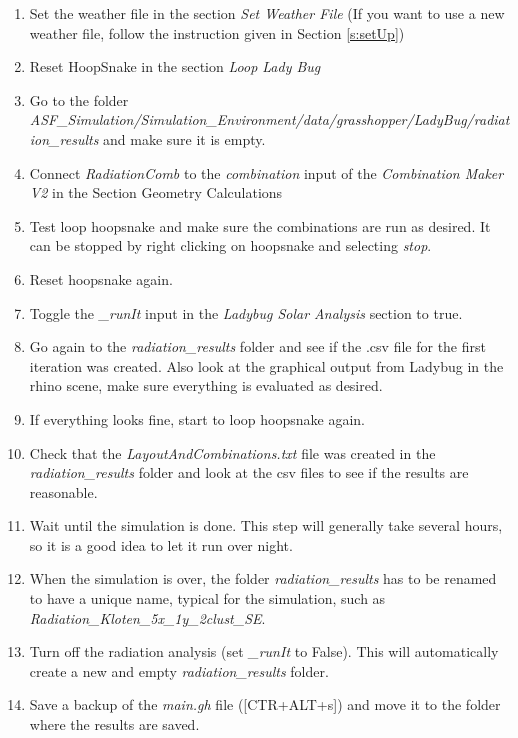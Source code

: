 	\begin{enumerate}

	\item Set the weather file in the section \emph{Set Weather File} (If you want to use a new weather file, follow the instruction given in Section \ref{s:setUp})

	\item Reset HoopSnake in the section \emph{Loop Lady Bug}

	\item Go to the folder \emph{ASF\_Simulation/Simulation\_Environment/data/}\linebreak\emph{grasshopper/LadyBug/radiation\_results} and make sure it is empty. 

	\item Connect \emph{RadiationComb} to the \emph{combination} input of the \emph{Combination Maker V2} in the Section Geometry Calculations

	\item Test loop hoopsnake and make sure the combinations are run as desired. It can be stopped by right clicking on hoopsnake and selecting \emph{stop}. 

	\item Reset hoopsnake again. 

	\item Toggle the \emph{\_runIt} input in the \emph{Ladybug Solar Analysis} section to true. 

	\item Go again to the \emph{radiation\_results} folder and see if the .csv file for the first iteration was created. Also look at the graphical output from Ladybug in the rhino scene, make sure everything is evaluated as desired. 

	\item If everything looks fine, start to loop hoopsnake again. 

	\item  Check that the \emph{LayoutAndCombinations.txt} file was created in the \emph{radiation\_results} folder and look at the csv files to see if the results are reasonable. 

	\item  Wait until the simulation is done. This step will generally take several hours, so it is a good idea to let it run over night. 

	\item  When the simulation is over, the folder \emph{radiation\_results} has to be renamed to have a unique name, typical for the simulation, such as \emph{Radiation\_Kloten\_5x\_1y\_2clust\_SE}. 

	\item  Turn off the radiation analysis (set \emph{\_runIt} to False). This will automatically create a new and empty \emph{radiation\_results} folder.  

	\item  Save a backup of the \emph{main.gh} file ([CTR+ALT+s]) and move it to the folder where the results are saved. 
	\end{enumerate}

